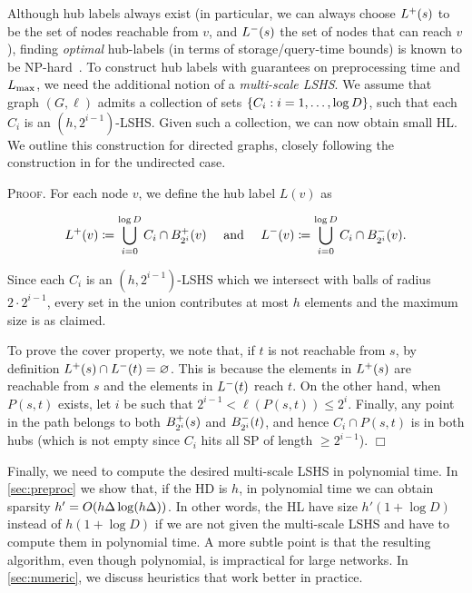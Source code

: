 \documentclass[opre,nonblindrev]{informs3} %
\renewenvironment{proof}[1][\textsc{Proof.}]{#1 }{\hfill $\Box$}
\begin{document}
Although hub labels always exist (in particular, we can always choose $\Lf(s)$ to be the set of nodes reachable from $v$, and $\Lb(s)$ the set of nodes that can reach $v$), finding \emph{optimal} hub-labels (in terms of storage/query-time bounds) is known to be NP-hard~\cite{babenko_hl_complexity}.
To construct hub labels with guarantees on preprocessing time and $\Lm$, we need the additional notion of a \emph{multi-scale LSHS}. 
We assume that graph $(G,\ell)$ admits a collection of sets $\crl*{C_i: i=1,\ldots,\log D}$, such that each $C_i$ is an $(h,2^{i-1})$-LSHS.
Given such a collection, we can now obtain small HL.
We outline this construction for directed graphs, closely following the construction in \cite[Theorem 5.1]{highway2013} for the undirected case.
\begin{proof}
For each node $v$, we define the hub label $L(v)$ as

\begin{equation*}
\Lf(v)\defeq  \bigcup_{i=0}^{\log D}C_i\cap \Bf_{2^i}(v) \quad\text{ and }\quad
\Lb(v)\defeq \bigcup_{i=0}^{\log D}C_i\cap \Bb_{2^i}(v).
\end{equation*}

Since each $C_i$ is an $(h,2^{i-1})$-LSHS which we intersect with balls of radius $2\cdot 2^{i-1}$, every set in the union contributes at most $h$ elements and the maximum size is as claimed.

To prove the cover property, we note that, if $t$ is not reachable from $s$, by definition $\Lf(s)\cap\Lb(t)=\varnothing$.
This is because the elements in $\Lf(s)$ are reachable from $s$ and the elements in $\Lb(t)$ reach $t$.
On the other hand, when $P(s,t)$ exists, let $i$ be such that $2^{i-1}<\ell(P(s,t))\leq 2^i$.
Finally, any point in the path belongs to both $\Bf_{2^i}(s)$ and $\Bb_{2^i}(t)$, and hence $C_i\cap P(s,t)$ is in both hubs (which is not empty since $C_i$ hits all SP of length $\geq 2^{i-1}$).
\end{proof}


Finally, we need to compute the desired multi-scale LSHS in polynomial time.
In \cref{sec:preproc} we show that, if the HD is $h$, in polynomial time we can obtain sparsity $h'=\Or(h\Delta\log(h\Delta))$.
In other words, the HL have size $h'(1+\log D)$ instead of $h(1+\log D)$ if we are not given the multi-scale LSHS and have to compute them in polynomial time.
A more subtle point is that the resulting algorithm, even though polynomial, is impractical for large networks.
In \cref{sec:numeric}, we discuss heuristics that work better in practice.
\end{document}

